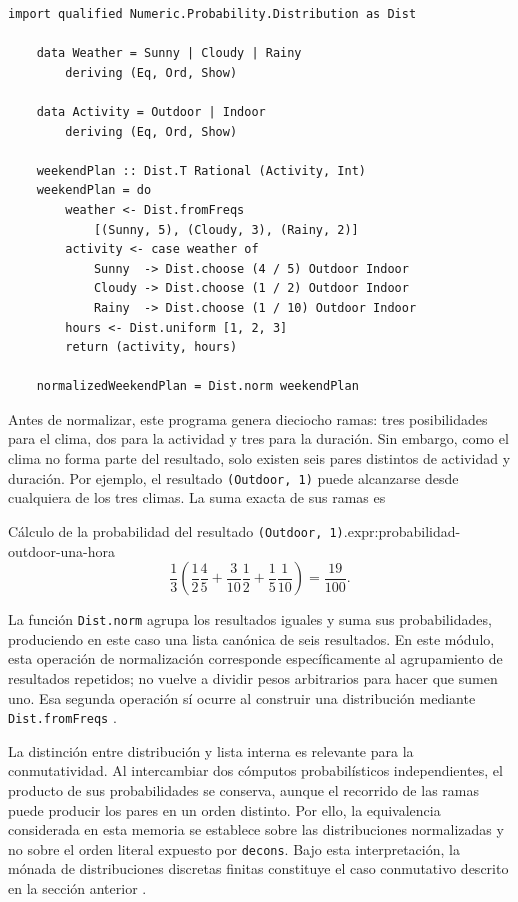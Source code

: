 \noindent\begin{minipage}{\textwidth}
\begin{lstlisting}[style=haskell,caption={Modelo probabilístico con frecuencias, elecciones condicionadas y una distribución uniforme.},label={lst:weighted-probability-example}]
    import qualified Numeric.Probability.Distribution as Dist

    data Weather = Sunny | Cloudy | Rainy
        deriving (Eq, Ord, Show)

    data Activity = Outdoor | Indoor
        deriving (Eq, Ord, Show)

    weekendPlan :: Dist.T Rational (Activity, Int)
    weekendPlan = do
        weather <- Dist.fromFreqs
            [(Sunny, 5), (Cloudy, 3), (Rainy, 2)]
        activity <- case weather of
            Sunny  -> Dist.choose (4 / 5) Outdoor Indoor
            Cloudy -> Dist.choose (1 / 2) Outdoor Indoor
            Rainy  -> Dist.choose (1 / 10) Outdoor Indoor
        hours <- Dist.uniform [1, 2, 3]
        return (activity, hours)

    normalizedWeekendPlan = Dist.norm weekendPlan
\end{lstlisting}
\end{minipage}

Antes de normalizar, este programa genera dieciocho ramas: tres posibilidades para el clima, dos para la actividad y tres para la duración. Sin embargo, como el clima no forma parte del resultado, solo existen seis pares distintos de actividad y duración. Por ejemplo, el resultado \texttt{(Outdoor, 1)} puede alcanzarse desde cualquiera de los tres climas. La suma exacta de sus ramas es

\begin{ReportExpression}{Cálculo de la probabilidad del resultado \texttt{(Outdoor, 1)}.}{expr:probabilidad-outdoor-una-hora}
\[
\frac{1}{3}\left(
    \frac{1}{2}\frac{4}{5}
    + \frac{3}{10}\frac{1}{2}
    + \frac{1}{5}\frac{1}{10}
\right)
= \frac{19}{100}.
\]
\end{ReportExpression}

La función \texttt{Dist.norm} agrupa los resultados iguales y suma sus probabilidades, produciendo en este caso una lista canónica de seis resultados. En este módulo, esta operación de normalización corresponde específicamente al agrupamiento de resultados repetidos; no vuelve a dividir pesos arbitrarios para hacer que sumen uno. Esa segunda operación sí ocurre al construir una distribución mediante \texttt{Dist.fromFreqs} \cite{HackageProbabilityDistribution}.

La distinción entre distribución y lista interna es relevante para la conmutatividad. Al intercambiar dos cómputos probabilísticos independientes, el producto de sus probabilidades se conserva, aunque el recorrido de las ramas puede producir los pares en un orden distinto. Por ello, la equivalencia considerada en esta memoria se establece sobre las distribuciones normalizadas y no sobre el orden literal expuesto por \texttt{decons}. Bajo esta interpretación, la mónada de distribuciones discretas finitas constituye el caso conmutativo descrito en la sección anterior \cite[sección~3.1]{Jacobs2018}.
